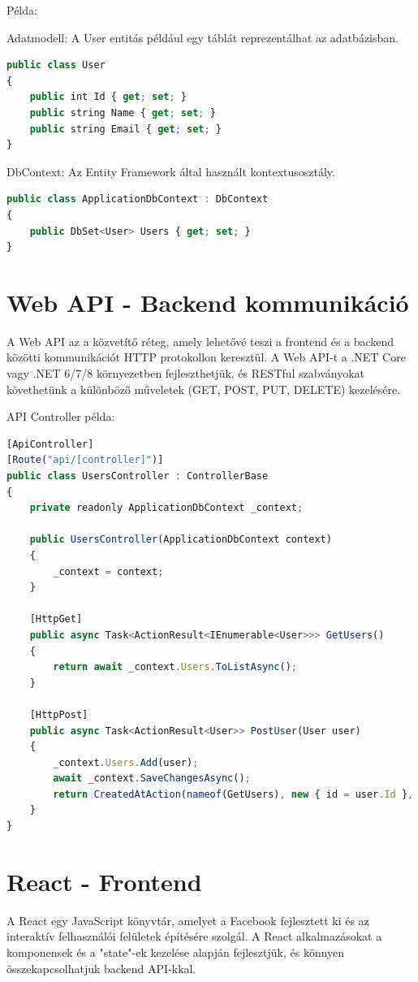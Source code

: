 \documentclass[colorlinks]{thesis-kando}
\theoremstyle{definition}
\theoremstyle{remark}
\begin{document}
Példa:

Adatmodell: A User entitás például egy táblát reprezentálhat az adatbázisban.

\begin{lstlisting}[language=JavaScript]
public class User
{
	public int Id { get; set; }
	public string Name { get; set; }
	public string Email { get; set; }
}
\end{lstlisting}
DbContext: Az Entity Framework által használt kontextusosztály.

\begin{lstlisting}[language=JavaScript]
public class ApplicationDbContext : DbContext
{
	public DbSet<User> Users { get; set; }
}
\end{lstlisting}
\section {Web API - Backend kommunikáció}
A Web API az a közvetítő réteg, amely lehetővé teszi a frontend és a backend közötti kommunikációt HTTP protokollon keresztül. A Web API-t a .NET Core vagy .NET 6/7/8 környezetben fejleszthetjük, és RESTful szabványokat követhetünk a különböző műveletek (GET, POST, PUT, DELETE) kezelésére.
\cite{we1}

API Controller példa:
\begin{lstlisting}[language=JavaScript]
[ApiController]
[Route("api/[controller]")]
public class UsersController : ControllerBase
{
	private readonly ApplicationDbContext _context;
	
	public UsersController(ApplicationDbContext context)
	{
		_context = context;
	}
	
	[HttpGet]
	public async Task<ActionResult<IEnumerable<User>>> GetUsers()
	{
		return await _context.Users.ToListAsync();
	}
	
	[HttpPost]
	public async Task<ActionResult<User>> PostUser(User user)
	{
		_context.Users.Add(user);
		await _context.SaveChangesAsync();
		return CreatedAtAction(nameof(GetUsers), new { id = user.Id }, user);
	}
}
\end{lstlisting}
\section {React - Frontend}
A React egy JavaScript könyvtár, amelyet a Facebook fejlesztett ki és az interaktív felhasználói felületek építésére szolgál. A React alkalmazásokat a komponensek és a "state"-ek kezelése alapján fejlesztjük, és könnyen összekapcsolhatjuk backend API-kkal.
\end{document}
